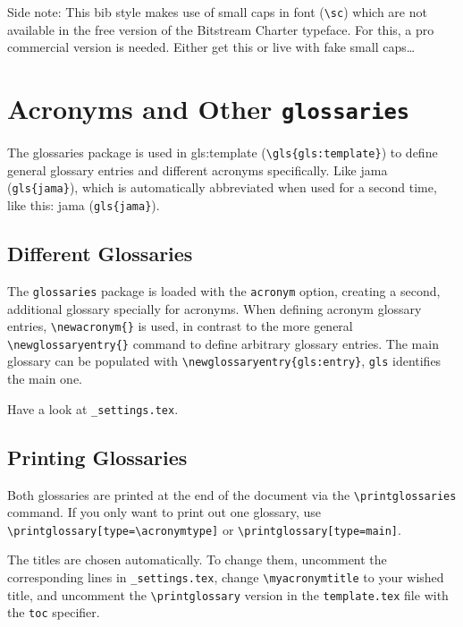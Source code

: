 Side note: This bib style makes use of small caps in font (\verb|\sc|) which are not available in the free version of the Bitstream Charter typeface. For this, a pro commercial version is needed. Either get this or live with fake small caps\ldots


\section{Acronyms and Other \texttt{glossaries}} %
\label{sec:glossaries}

The glossaries package is used in \gls{gls:template} (\verb|\gls{gls:template}|) to define general glossary entries and different acronyms specifically. Like \gls{jama} (\verb|gls{jama}|), which is automatically abbreviated when used for a second time, like this: \gls{jama} (\verb|gls{jama}|).

\subsection{Different Glossaries} %
\label{sub:different_glossaries_acronyms_and_titles}
The \texttt{glossaries} package is loaded with the \texttt{acronym} option, creating a second, additional glossary specially for acronyms. When defining acronym glossary entries, \verb|\newacronym{}| is used, in contrast to the more general \verb|\newglossaryentry{}| command to define arbitrary glossary entries. The main glossary can be populated with \verb|\newglossaryentry{gls:entry}|, \texttt{gls} identifies the main one.

Have a look at \verb|_settings.tex|.

\subsection{Printing Glossaries} %
\label{sub:printing_glossaries}
Both glossaries are printed at the end of the document via the \verb|\printglossaries| command. If you only want to print out one glossary, use \verb|\printglossary[type=\acronymtype]| or \verb|\printglossary[type=main]|.

The titles are chosen automatically. To change them, uncomment the corresponding lines in \verb|_settings.tex|, change \verb|\myacronymtitle| to your wished title, and uncomment the \verb|\printglossary| version in the \texttt{template.tex} file with the \texttt{toc} specifier.
